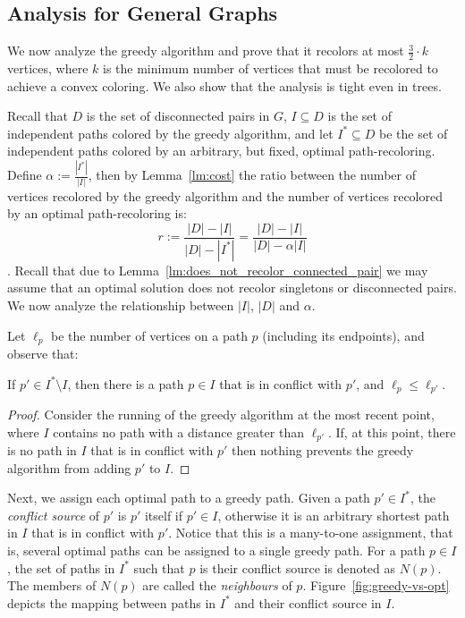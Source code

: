
\subsection{Analysis for General Graphs}

We now analyze the greedy algorithm and prove that it recolors at most 
$\frac{3}{2} \cdot k$ vertices, 
where $k$ is the minimum number of vertices that must be recolored to achieve a convex
coloring.
%
We also show that the analysis is tight even in trees.

Recall that $D$ is the set of disconnected pairs in $G$, 
$I \subseteq D$ is the set of independent paths colored by the greedy algorithm, 
and let $I^* \subseteq D$ be the set of independent paths colored by an arbitrary, 
but fixed,
optimal path-recoloring.  
%
Define $\alpha := \frac{|I^*|}{|I|}$,
then by Lemma~\ref{lm:cost} the ratio between the number of 
vertices recolored by the greedy algorithm and the number of vertices
recolored by an optimal path-recoloring is:
\[
r := \frac{|D| - |I|}{|D| - |I^*|}
= \frac{|D| - |I|}{|D| - \alpha |I|}
\].
Recall that due to Lemma~\ref{lm:does_not_recolor_connected_pair} we
may assume that an optimal solution does not recolor singletons or
disconnected pairs.
%
We now analyze the relationship between $|I|$, $|D|$ and $\alpha$.

Let $\ell_p$ be the number of vertices on a path $p$ (including its endpoints), 
and observe that:

\begin{lemma}
\label{lemma:assign}
If $p' \in I^* \setminus I$, then there is a path $p \in I$ that is in
conflict with $p'$, and $\ell_p \leq \ell_{p'}$.
\end{lemma}
\begin{proof}
Consider the running of the greedy algorithm at the most recent point,
where $I$ contains no path with a distance greater than $\ell_{p'}$.  If,
at this point, there is no path in $I$ that is in conflict with $p'$
then nothing prevents the greedy algorithm from adding $p'$ to $I$.
{}\end{proof}

Next, we assign each optimal path to a greedy path.
%
Given a path $p' \in I^*$, the \emph{conflict source} of $p'$ is $p'$
itself if $p' \in I$, otherwise it is an arbitrary shortest path in
$I$ that is in conflict with $p'$.
%
Notice that this is a many-to-one assignment, that is, several optimal
paths can be assigned to a single greedy path.
%
For a path $p \in I$, the set of paths in $I^*$ such that $p$ is their
conflict source is denoted as $N(p)$.
The members of $N(p)$ are called the \emph{neighbours} of $p$.
Figure~\ref{fig:greedy-vs-opt} depicts the mapping between paths in 
$I^*$ and their conflict source in $I$.

